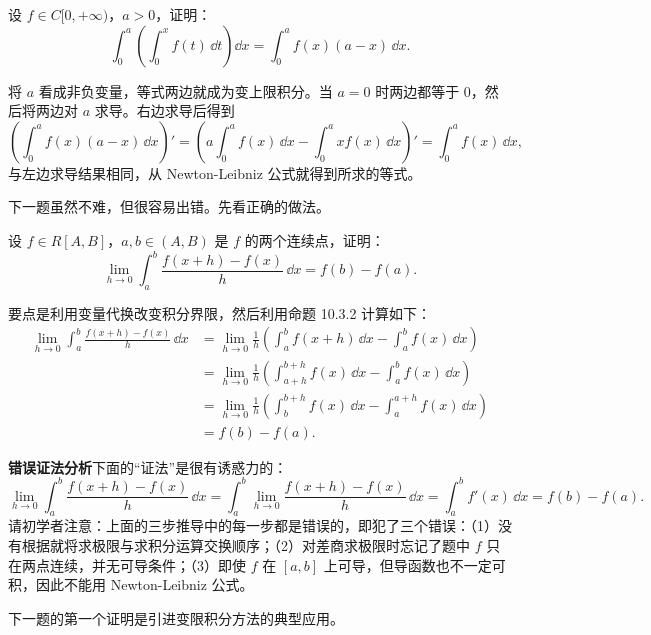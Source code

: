 \begin{xexample}[10.3.1]
设 $f\in C[0,+\infty)$，$a>0$，证明：
\[
  \int_0^a\left(\int_0^x f(t)\,\dd t\right)\dd x
  =\int_0^a f(x)(a-x)\,\dd x.
\]
\end{xexample}
\begin{xsolution}
将 $a$ 看成非负变量，等式两边就成为变上限积分。当 $a=0$ 时两边都等于 0，然后将两边对 $a$ 求导。右边求导后得到
\[
  \left(\int_0^a f(x)(a-x)\,\dd x\right)'
  =\left(a\int_0^a f(x)\,\dd x-\int_0^a xf(x)\,\dd x\right)'
  =\int_0^a f(x)\,\dd x,
\]
与左边求导结果相同，从 Newton-Leibniz 公式就得到所求的等式。
\end{xsolution}

下一题虽然不难，但很容易出错。先看正确的做法。

\begin{xexample}[10.3.2]
设 $f\in R[A,B]$，$a,b\in(A,B)$ 是 $f$ 的两个连续点，证明：
\[
  \lim_{h\to0}\int_a^b\frac{f(x+h)-f(x)}{h}\,\dd x=f(b)-f(a).
\]
\end{xexample}
\begin{xsolution}
要点是利用变量代换改变积分界限，然后利用命题 10.3.2 计算如下：
\begin{align*}
  \lim_{h\to0}\int_a^b\frac{f(x+h)-f(x)}h\,\dd x
  &=\lim_{h\to0}\frac1h\left(\int_a^b f(x+h)\,\dd x-\int_a^b f(x)\,\dd x\right)\\
  &=\lim_{h\to0}\frac1h\left(\int_{a+h}^{b+h}f(x)\,\dd x-\int_a^b f(x)\,\dd x\right)\\
  &=\lim_{h\to0}\frac1h\left(\int_b^{b+h}f(x)\,\dd x-\int_a^{a+h}f(x)\,\dd x\right)\\
  &=f(b)-f(a).
\end{align*}
\end{xsolution}

\begin{xremark}
\textbf{错误证法分析}\quad 下面的“证法”是很有诱惑力的：
\[
  \lim_{h\to0}\int_a^b\frac{f(x+h)-f(x)}h\,\dd x
  =\int_a^b\lim_{h\to0}\frac{f(x+h)-f(x)}h\,\dd x
  =\int_a^b f'(x)\,\dd x=f(b)-f(a).
\]
请初学者注意：上面的三步推导中的每一步都是错误的，即犯了三个错误：（1）没有根据就将求极限与求积分运算交换顺序；（2）对差商求极限时忘记了题中 $f$ 只在两点连续，并无可导条件；（3）即使 $f$ 在 $[a,b]$ 上可导，但导函数也不一定可积，因此不能用 Newton-Leibniz 公式。
\end{xremark}

下一题的第一个证明是引进变限积分方法的典型应用。

